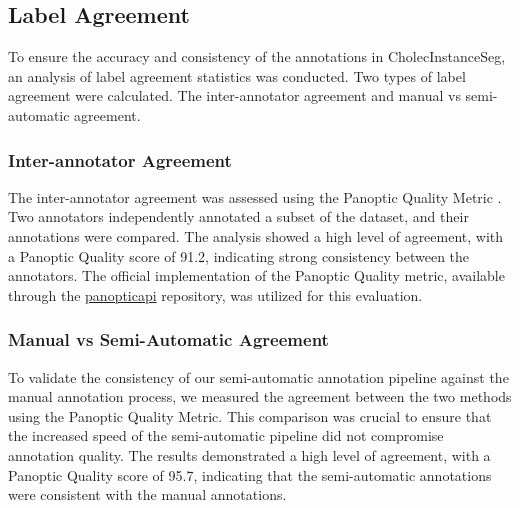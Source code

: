 \subsection{Label Agreement}
To ensure the accuracy and consistency of the annotations in CholecInstanceSeg, an analysis of label agreement statistics was conducted. Two types of label agreement were calculated. The inter-annotator agreement and manual vs semi-automatic agreement. 

\subsubsection{Inter-annotator Agreement}
The inter-annotator agreement was assessed using the Panoptic Quality Metric \cite{kirillov2019panoptic}. Two annotators independently annotated a subset of the dataset, and their annotations were compared. The analysis showed a high level of agreement, with a Panoptic Quality score of 91.2, indicating strong consistency between the annotators. The official implementation of the Panoptic Quality metric, available through the \href{https://github.com/cocodataset/panopticapi/tree/master}{panopticapi} repository, was utilized for this evaluation.

\subsubsection{Manual vs Semi-Automatic Agreement}
To validate the consistency of our semi-automatic annotation pipeline against the manual annotation process, we measured the agreement between the two methods using the Panoptic Quality Metric. This comparison was crucial to ensure that the increased speed of the semi-automatic pipeline did not compromise annotation quality. The results demonstrated a high level of agreement, with a Panoptic Quality score of 95.7, indicating that the semi-automatic annotations were consistent with the manual annotations.


